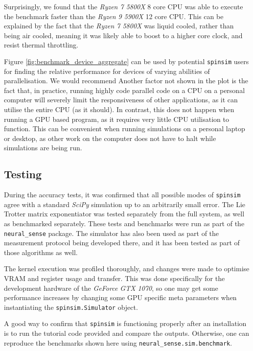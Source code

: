 \documentclass{jors}
\begin{document}
			Surprisingly, we found that the \emph{Ryzen 7 5800X} 8 core CPU was able to execute the benchmark faster than the \emph{Ryzen 9 5900X} 12 core CPU. This can be explained by the fact that the \emph{Ryzen 7 5800X} was liquid cooled, rather than being air cooled, meaning it was likely able to boost to a higher core clock, and resist thermal throttling.

			Figure \ref{fig:benchmark_device_aggregate} can be used by potential \texttt{spinsim} users for finding the relative performance for devices of varying abilities of parallelisation. We would recommend Another factor not shown in the plot is the fact that, in practice, running highly code parallel code on a CPU on a personal computer will severely limit the responsiveness of other applications, as it can utilise the entire CPU (as it should). In contrast, this does not happen when running a GPU based program, as it requires very little CPU utilisation to function. This can be convenient when running simulations on a personal laptop or desktop, as other work on the computer does not have to halt while simulations are being run.

	\subsection{Testing}
		During the accuracy tests, it was confirmed that all possible modes of \texttt{spinsim} agree with a standard \emph{SciPy} simulation up to an arbitrarily small error. The Lie Trotter matrix exponentiator was tested separately from the full system, as well as benchmarked separately. These tests and benchmarks were run as part of the \texttt{neural\_sense} package. The simulator has also been used as part of the measurement protocol being developed there, and it has been tested as part of those algorithms as well.

		The kernel execution was profiled thoroughly, and changes were made to optimise VRAM and register usage and transfer. This was done specifically for the development hardware of the \emph{GeForce GTX 1070}, so one may get some performance increases by changing some GPU specific meta parameters when instantiating the \texttt{spinsim.Simulator} object.

		A good way to confirm that \texttt{spinsim} is functioning properly after an installation is to run the tutorial code provided and compare the outputs. Otherwise, one can reproduce the benchmarks shown here using \texttt{neural\_sense.sim.benchmark}.
\end{document}
